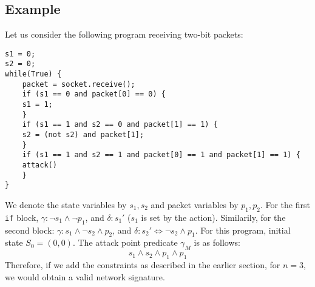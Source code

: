 \documentclass[]{article}
\begin{document}
\subsection{Example}
Let us consider the following program receiving two-bit packets:
\begin{lstlisting}	
s1 = 0;
s2 = 0;
while(True) {
	packet = socket.receive();
	if (s1 == 0 and packet[0] == 0) {
	s1 = 1;
	}
	if (s1 == 1 and s2 == 0 and packet[1] == 1) {
	s2 = (not s2) and packet[1];
	}
	if (s1 == 1 and s2 == 1 and packet[0] == 1 and packet[1] == 1) {
	attack()  
	}	
}
\end{lstlisting}	
We denote the state variables by $s_1, s_2$ and packet 
variables by $p_1, p_2$.
For the first \texttt{if} block, 
$\gamma: \neg s_1 \wedge \neg p_1$, and $\delta: s_1'$ ($s_1$ 
is set by the action). Similarily,
for the second block: 
$\gamma: s_1 \wedge \neg s_2 \wedge p_2$, and $\delta: 
s_2' \Leftrightarrow \neg s_2 \wedge p_1$.
For this program, initial state $S_0 = (0, 0)$.
The attack point predicate $\gamma_M$ is as follows:
\begin{equation}
	s_1 \wedge s_2 \wedge p_1 \wedge p_1
\end{equation}
Therefore, if we add the constraints as described in the 
earlier section, for $n=3$, we would obtain a
valid network signature. 





\end{document}
